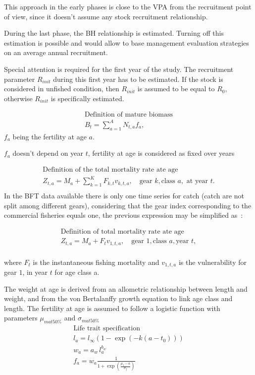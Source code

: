 This
approach  in the  early  phases is  close to  the  VPA from  the
recruitment  point  of  view,  since   it  doesn't  assume  any  stock
recruitment relationship. 


During the last phase, the  BH relationship is estimated. Turning off this estimation is possible and would allow to base management evaluation strategies on an average annual recruitment.


Special attention is required for the first year of the study. The recruitment parameter $R_{init}$ during this first year has to be estimated.
If the stock is considered in unfished condition, then $R_{init}$ is assumed to be equal to $R_0$, otherwise $R_{init}$ is specifically estimated. 

\begin{gather}
\mbox{Definition of mature biomass}\\
B_t= \sum_{a=1}^A N_{t,a} f_a,
\end{gather} 
$f_a$ being the fertility at age $a$. 

$f_a$ doesn't depend  on year $t$, fertility at  age is considered
  as fixed over years

  
  
\begin{gather}
  \mbox{Definition of the total mortality rate ate age}\\
  Z_{t,a}= M_a + \sum_{k=1}^K F_{k,t} v_{k, t,a}, \quad \mbox{gear }k,
  \mbox{class }a, \mbox{ at year }t.   \\
\end{gather} 
In  the  BFT  data  available  there is  only  one  time  series  for
 catch (catch are  not split among different  gears), considering that
 the gear index corresponding to the 
commercial fisheries equals one, the previous expression may be simplified as~:

\begin{gather}
  \mbox{Definition of total mortality rate ate age}\\
  Z_{t,a}= M_a + F_t v_{1, t,a}, \quad \mbox{gear } 1,
  \mbox{class }a, \mbox{year }t,   \\
\end{gather} 

where $F_t$ is the instantaneous  fishing mortality and $v_{1,t,a}$ is
the vulnerability for gear $1$, in year $t$ for age class a.

The weight at age is derived from an allometric relationship between length and weight, and from the von Bertalanffy growth equation to link age class and length.
The fertility at age is assumed to follow a logistic function with parameters $\mu_{mat 50\%}$ and $\sigma_{mat 50\%}$ 
\begin{gather}
  \mbox{Life trait specification}\\
l_a = l_\infty \left( 1- \exp{\left(-k\left( a - t_0\right)\right)}\right) \\
w_a = a_w\, l_a^{b_w} \\
f_a = w_a \frac{1}{1+\exp{ \left(\frac{\mu_f - a}{\sigma_f}\right)}}\\
  \end{gather}
  


